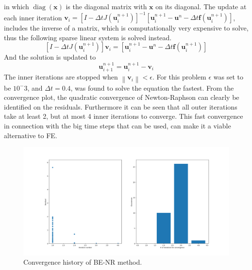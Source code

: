 \documentclass{article}
\newcommand{\norm}[1]{\left\lVert#1\right\rVert}
\begin{document}
in which $\operatorname{diag}(\mathbf{x})$ is the diagonal matrix with $\mathbf{x}$ on its diagonal. The update at each inner iteration $\mathbf{v}_i = \left[I-\Delta t J\left(\mathbf{u}_{i}^{n+1}\right)\right]^{-1}\left[\mathbf{u}_{i}^{n+1}-\mathbf{u}^{n}-\Delta t \mathbf{f}\left(\mathbf{u}_{i}^{n+1}\right)\right]$, includes the inverse of a matrix, which is computationally very expensive to solve, thus the following sparse linear system is solved instead.
\begin{equation}
\left[I-\Delta t J\left(\mathbf{u}_{i}^{n+1}\right)\right] \mathbf{v}_i = \left[\mathbf{u}_{i}^{n+1}-\mathbf{u}^{n}-\Delta t \mathbf{f}\left(\mathbf{u}_{i}^{n+1}\right)\right]
\end{equation}
And the solution is updated to
\begin{equation}
	\mathbf{u}^{n+1}_{i+1} = 	\mathbf{u}^{n+1}_{i} - \mathbf{v}_i
\end{equation}
The inner iterations are stopped when $\norm{\mathbf{v}_i} < \epsilon$.
For this problem $\epsilon$ was set to be $10^-3$, and $\Delta t = 0.4$, was found to solve the equation the fastest. From the convergence plot, the quadratic convergence of Newton-Raphson can clearly be identified on the residuals. Furthermore it can be seen that all outer iterations take at least 2, but at most 4 inner iterations to converge. This fast convergence in connection with the big time steps that can be used, can make it a viable alternative to FE.
\begin{figure}[H]
	\centering
	\includegraphics[width=.9\linewidth]{4ConvergenceNewton.png}
	\caption{Convergence history of BE-NR method.}
\end{figure}
\end{document}
